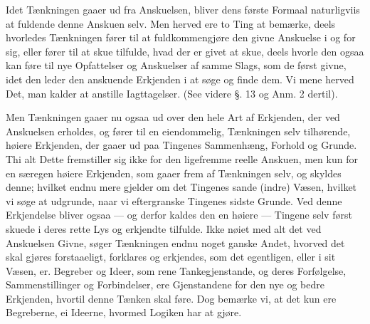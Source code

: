 \documentclass[12pt]{book}
\def\textit#1{#1}%
\def\emph#1{#1}%
\newcommand{\opage}[1]{\marginnote{\footnotesize\textit{[#1]}}}
\begin{document}
Idet Tænkningen gaaer ud fra Anskuelsen, bliver dens første \emph{Formaal}
naturligviis at fuldende denne Anskuen selv. Men herved ere to Ting at
bemærke, deels hvorledes Tænkningen fører til at fuldkommengjøre den givne
Anskuelse i og for sig, eller fører til at \emph{skue} tilfulde, hvad der er
givet at \emph{skue}, deels hvorle%
\opage{14}%
den ogsaa kan føre til nye Opfattelser og Anskuelser af samme Slags, som de
først givne, idet den leder den anskuende Erkjenden i at søge og finde dem.
Vi mene herved Det, man kalder \emph{at anstille Iagttagelser}.
(See videre §. 13 og Anm. 2 dertil).

Men Tænkningen gaaer nu ogsaa ud over den hele Art af Erkjenden, der ved
Anskuelsen erholdes, og fører til en eiendommelig, Tænkningen selv tilhørende,
høiere Erkjenden, der gaaer ud paa Tingenes Sammenhæng, Forhold og Grunde. Thi
alt Dette fremstiller sig ikke for den ligefremme reelle Anskuen, men kun for
en særegen høiere Erkjenden, som gaaer frem af Tænkningen selv, og skyldes
denne; hvilket endnu mere gjelder om det Tingenes sande (indre) Væsen, hvilket
vi søge at udgrunde, naar vi eftergranske Tingenes sidste Grunde. Ved denne
Erkjendelse bliver ogsaa --- og derfor kaldes den en høiere --- Tingene selv
først skuede i deres rette Lys og erkjendte tilfulde. Ikke nøiet med alt det
ved Anskuelsen Givne, søger Tænkningen endnu noget ganske Andet, hvorved det
skal gjøres forstaaeligt, forklares og erkjendes, som det egentligen, eller i
sit Væsen, er. Begreber og Ideer, som rene Tankegjenstande, og deres
Forfølgelse, Sammenstillinger og Forbindelser, ere Gjenstandene for den nye og
bedre Erkjenden, hvortil denne Tænken skal føre. Dog bemærke vi, at det kun ere
Begreberne, ei Ideerne, hvormed Logiken har at gjøre.
\end{document}
